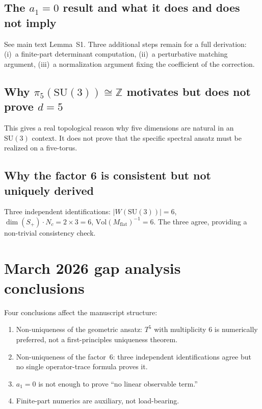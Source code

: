 \documentclass[11pt,a4paper]{article}
\begin{document}
\subsection{The $a_1=0$ result and what it does and does not imply}
See main text Lemma~S1.  Three additional steps remain for a full derivation:
(i)~a finite-part determinant computation, (ii)~a perturbative matching argument,
(iii)~a normalization argument fixing the coefficient of the correction.

\subsection{Why $\pi_5(\mathrm{SU}(3))\cong\mathbb{Z}$ motivates but does not prove $d=5$}
This gives a real topological reason why five dimensions are natural in an
$\mathrm{SU}(3)$ context.  It does not prove that the specific spectral ansatz must
be realized on a five-torus.

\subsection{Why the factor 6 is consistent but not uniquely derived}
Three independent identifications: $|W(\mathrm{SU}(3))|=6$, $\dim(S_+)\cdot N_c=2\times3=6$,
$\mathrm{Vol}(M_{\mathrm{flat}})^{-1}=6$.  The three agree, providing a non-trivial
consistency check.

\section{March 2026 gap analysis conclusions}
Four conclusions affect the manuscript structure:
\begin{enumerate}[label=(\roman*)]
\item Non-uniqueness of the geometric ansatz: $T^5$ with multiplicity 6 is
  numerically preferred, not a first-principles uniqueness theorem.
\item Non-uniqueness of the factor~6: three independent identifications agree
  but no single operator-trace formula proves it.
\item $a_1=0$ is not enough to prove ``no linear observable term.''
\item Finite-part numerics are auxiliary, not load-bearing.
\end{enumerate}

\end{document}
